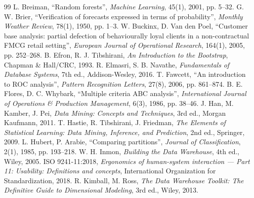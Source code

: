 \begin{thebibliography}{99}
 L. Breiman, ``Random forests'', \textit{Machine Learning}, 45(1), 2001, pp. 5--32.
 G. W. Brier, ``Verification of forecasts expressed in terms of probability'', \textit{Monthly Weather Review}, 78(1), 1950, pp. 1--3.
 W. Buckinx, D. Van den Poel, ``Customer base analysis: partial defection of behaviourally loyal clients in a non-contractual FMCG retail setting'', \textit{European Journal of Operational Research}, 164(1), 2005, pp. 252--268.
 B. Efron, R. J. Tibshirani, \textit{An Introduction to the Bootstrap}, Chapman \& Hall/CRC, 1993.
 R. Elmasri, S. B. Navathe, \textit{Fundamentals of Database Systems}, 7th ed., Addison-Wesley, 2016.
 T. Fawcett, ``An introduction to ROC analysis'', \textit{Pattern Recognition Letters}, 27(8), 2006, pp. 861--874.
 B. E. Flores, D. C. Whybark, ``Multiple criteria ABC analysis'', \textit{International Journal of Operations \& Production Management}, 6(3), 1986, pp. 38--46.
 J. Han, M. Kamber, J. Pei, \textit{Data Mining: Concepts and Techniques}, 3rd ed., Morgan Kaufmann, 2011.
 T. Hastie, R. Tibshirani, J. Friedman, \textit{The Elements of Statistical Learning: Data Mining, Inference, and Prediction}, 2nd ed., Springer, 2009.
 L. Hubert, P. Arabie, ``Comparing partitions'', \textit{Journal of Classification}, 2(1), 1985, pp. 193--218.
 W. H. Inmon, \textit{Building the Data Warehouse}, 4th ed., Wiley, 2005.
 ISO 9241-11:2018, \textit{Ergonomics of human-system interaction --- Part 11: Usability: Definitions and concepts}, International Organization for Standardization, 2018.
 R. Kimball, M. Ross, \textit{The Data Warehouse Toolkit: The Definitive Guide to Dimensional Modeling}, 3rd ed., Wiley, 2013.

\end{thebibliography}
